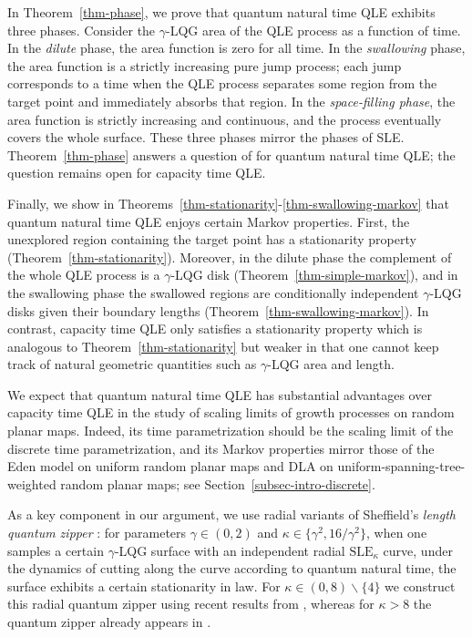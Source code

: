 \documentclass[a4paper]{article}
\numberwithin{equation}{section}
\newcommand{\SLE}{\mathrm{SLE}}
\theoremstyle{remark}
\numberwithin{equation}{section}
\begin{document}
In Theorem~\ref{thm-phase}, we prove that quantum natural time QLE exhibits three phases. Consider the $\gamma$-LQG area of the QLE process as a function of time. In the \emph{dilute} phase, the area function is zero for all time. In the \emph{swallowing} phase, the area function is a strictly increasing pure jump process; each jump corresponds to a time when the QLE process separates some region from the target point and immediately absorbs that region. In the \emph{space-filling phase}, the area function is strictly increasing and continuous, and the process eventually covers the whole surface. These three phases mirror the phases of SLE. Theorem~\ref{thm-phase} answers a question of \cite[Section 8.2]{ms-qle} for quantum natural time QLE; the question remains open for capacity time QLE. 

Finally, we show in Theorems~\ref{thm-stationarity}-\ref{thm-swallowing-markov} that quantum natural time QLE enjoys certain Markov properties. First, the unexplored region containing the target point has a stationarity property (Theorem~\ref{thm-stationarity}). Moreover, in the dilute phase the complement of the whole QLE process is a $\gamma$-LQG disk (Theorem~\ref{thm-simple-markov}), and in the swallowing phase the swallowed regions are conditionally independent $\gamma$-LQG disks given their boundary lengths (Theorem~\ref{thm-swallowing-markov}). In contrast, capacity time QLE only satisfies a stationarity property which is analogous to Theorem~\ref{thm-stationarity} but weaker in that one cannot keep track of natural geometric quantities such as $\gamma$-LQG area and length. 

We expect that quantum natural time QLE has substantial advantages over capacity time QLE in the study of scaling limits of growth processes on random planar maps. Indeed, its time parametrization should be the scaling limit of the discrete time parametrization, and its Markov properties mirror those of the Eden model on uniform random planar maps and DLA on uniform-spanning-tree-weighted random planar maps; see Section~\ref{subsec-intro-discrete}.

As a key component in our argument, we use radial variants of Sheffield's \emph{length quantum zipper} \cite[Theorem 1.8]{shef-zipper}: for parameters $\gamma \in (0,2)$ and $\kappa \in \{\gamma^2, 16/\gamma^2\}$, when one samples a certain $\gamma$-LQG surface with an independent radial $\SLE_\kappa$ curve, under the dynamics of cutting along the curve according to quantum natural time, the surface exhibits a certain stationarity in law. For $\kappa \in (0,8) \backslash \{4\}$ we construct this radial quantum zipper using recent results from \cite{ay-radial}, whereas for $\kappa > 8$ the quantum zipper already appears in \cite{ay-reversibility}.
\end{document}
